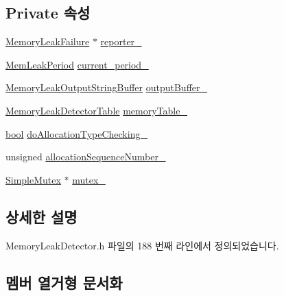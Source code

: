 \subsection*{Private 속성}
\begin{DoxyCompactItemize}
\item 
\hyperlink{class_memory_leak_failure}{Memory\+Leak\+Failure} $\ast$ \hyperlink{class_memory_leak_detector_a632df6e6476c93d9c58a104a17e155d9}{reporter\+\_\+}
\item 
\hyperlink{_memory_leak_detector_8h_ab248e6cc6c6699b88b002286d8a3ed76}{Mem\+Leak\+Period} \hyperlink{class_memory_leak_detector_af82b746b32f3ce3919db77a6985bab42}{current\+\_\+period\+\_\+}
\item 
\hyperlink{class_memory_leak_output_string_buffer}{Memory\+Leak\+Output\+String\+Buffer} \hyperlink{class_memory_leak_detector_a7d0b175420d83f9ee397b398ae14ac75}{output\+Buffer\+\_\+}
\item 
\hyperlink{struct_memory_leak_detector_table}{Memory\+Leak\+Detector\+Table} \hyperlink{class_memory_leak_detector_abee17cabbc59ef23d6f51027208a100c}{memory\+Table\+\_\+}
\item 
\hyperlink{avb__gptp_8h_af6a258d8f3ee5206d682d799316314b1}{bool} \hyperlink{class_memory_leak_detector_a9355cba4a5dcc00a72553874773d209e}{do\+Allocation\+Type\+Checking\+\_\+}
\item 
unsigned \hyperlink{class_memory_leak_detector_a848e960c1d67dbe545416e2541663260}{allocation\+Sequence\+Number\+\_\+}
\item 
\hyperlink{class_simple_mutex}{Simple\+Mutex} $\ast$ \hyperlink{class_memory_leak_detector_ab92d2f1606fbc62f3c4d5184d735dd04}{mutex\+\_\+}
\end{DoxyCompactItemize}


\subsection{상세한 설명}


Memory\+Leak\+Detector.\+h 파일의 188 번째 라인에서 정의되었습니다.



\subsection{멤버 열거형 문서화}
